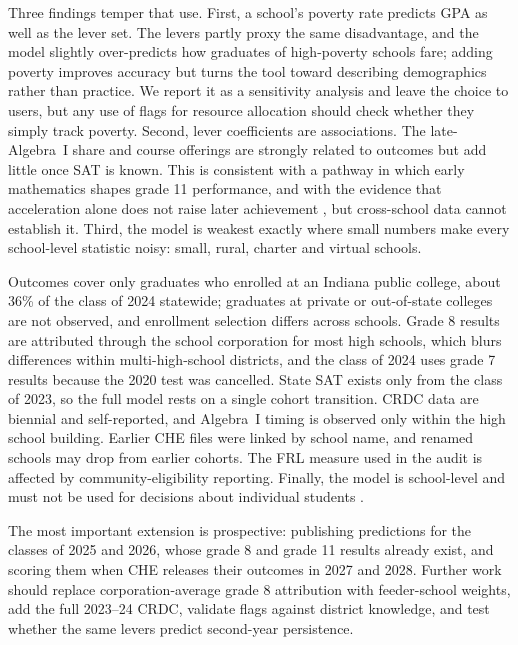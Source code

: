 \documentclass[11pt]{article}
\newcommand{\subsec}[1]{\par\vspace{1.6ex}\noindent{\large\bfseries #1}\par\vspace{0.8ex}\noindent\ignorespaces}
\begin{document}
Three findings temper that use. First, a school's poverty rate predicts GPA as well as the lever set. The levers partly proxy the same disadvantage, and the model slightly over-predicts how graduates of high-poverty schools fare; adding poverty improves accuracy but turns the tool toward describing demographics rather than practice. We report it as a sensitivity analysis and leave the choice to users, but any use of flags for resource allocation should check whether they simply track poverty. Second, lever coefficients are associations. The late-Algebra~I share and course offerings are strongly related to outcomes but add little once SAT is known. This is consistent with a pathway in which early mathematics shapes grade 11 performance, and with the evidence that acceleration alone does not raise later achievement \citep{clotfelter2015,domina2015}, but cross-school data cannot establish it. Third, the model is weakest exactly where small numbers make every school-level statistic noisy: small, rural, charter and virtual schools.

\subsec{Limitations}
Outcomes cover only graduates who enrolled at an Indiana public college, about 36\% of the class of 2024 statewide; graduates at private or out-of-state colleges are not observed, and enrollment selection differs across schools. Grade 8 results are attributed through the school corporation for most high schools, which blurs differences within multi-high-school districts, and the class of 2024 uses grade 7 results because the 2020 test was cancelled. State SAT exists only from the class of 2023, so the full model rests on a single cohort transition. CRDC data are biennial and self-reported, and Algebra~I timing is observed only within the high school building. Earlier CHE files were linked by school name, and renamed schools may drop from earlier cohorts. The FRL measure used in the audit is affected by community-eligibility reporting. Finally, the model is school-level and must not be used for decisions about individual students \citep{robinson1950}.

\subsec{Next steps}
The most important extension is prospective: publishing predictions for the classes of 2025 and 2026, whose grade 8 and grade 11 results already exist, and scoring them when CHE releases their outcomes in 2027 and 2028. Further work should replace corporation-average grade 8 attribution with feeder-school weights, add the full 2023--24 CRDC, validate flags against district knowledge, and test whether the same levers predict second-year persistence.
\end{document}
